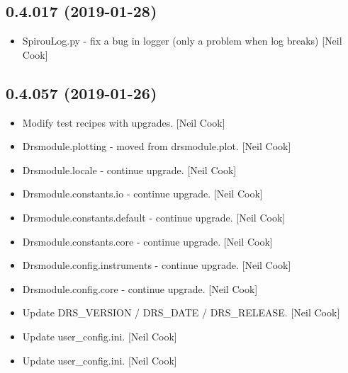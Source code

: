 \documentclass[a4paper,10pt,english]{report}
\begin{document}
\subsection{0.4.017 (2019-01-28)}
\label{\detokenize{misc/changelog:id204}}\begin{itemize}
\item {} 
SpirouLog.py - fix a bug in logger (only a problem when log breaks)
{[}Neil Cook{]}

\end{itemize}


\subsection{0.4.057 (2019-01-26)}
\label{\detokenize{misc/changelog:id205}}\begin{itemize}
\item {} 
Modify test recipes with upgrades. {[}Neil Cook{]}

\item {} 
Drsmodule.plotting - moved from drsmodule.plot. {[}Neil Cook{]}

\item {} 
Drsmodule.locale - continue upgrade. {[}Neil Cook{]}

\item {} 
Drsmodule.constants.io - continue upgrade. {[}Neil Cook{]}

\item {} 
Drsmodule.constants.default - continue upgrade. {[}Neil Cook{]}

\item {} 
Drsmodule.constants.core - continue upgrade. {[}Neil Cook{]}

\item {} 
Drsmodule.config.instruments - continue upgrade. {[}Neil Cook{]}

\item {} 
Drsmodule.config.core - continue upgrade. {[}Neil Cook{]}

\item {} 
Update DRS\_VERSION / DRS\_DATE / DRS\_RELEASE. {[}Neil Cook{]}

\item {} 
Update user\_config.ini. {[}Neil Cook{]}

\item {} 
Update user\_config.ini. {[}Neil Cook{]}

\end{itemize}
\end{document}
